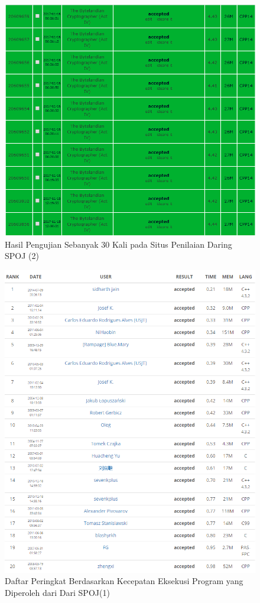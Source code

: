   \begin{figure}[H]
  \centering
  	\includegraphics[scale=0.5]{images/lampiran/uji3.png}
  	\caption{Hasil Pengujian Sebanyak 30 Kali pada Situs Penilaian Daring SPOJ (2)}
  	\label{fig:submission2}
  \end{figure}
  
  \begin{figure}[H]
  \centering
  	\includegraphics[scale=0.55]{images/lampiran/rankdiatas1.png}
  	\caption{Daftar Peringkat Berdasarkan Kecepatan Eksekusi Program yang Diperoleh dari Dari SPOJ(1)}
  	\label{fig:per1}
  \end{figure}
  
